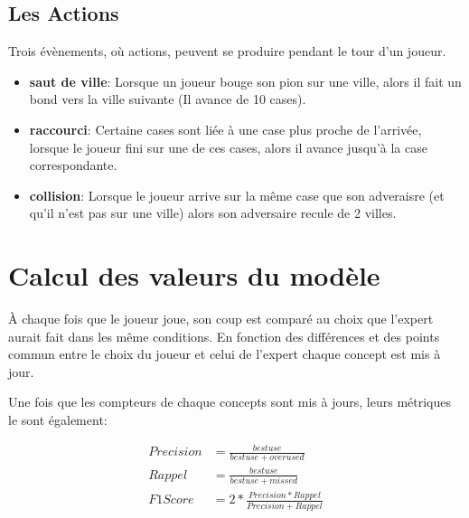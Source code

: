 \documentclass[a4paper, 12pt]{article}
\begin{document}
\subsection{Les Actions}
Trois évènements, où actions, peuvent se produire pendant le tour d'un joueur.
\begin{itemize}
	\item \textbf{saut de ville}: Lorsque un joueur bouge son pion sur une ville, alors il fait un bond vers la ville suivante (Il avance de 10 cases).
	\item \textbf{raccourci}: Certaine cases sont liée à une case plus proche de l'arrivée, lorsque le joueur fini sur une de ces cases, alors il avance jusqu'à la case correspondante.
	\item \textbf{collision}: Lorsque le joueur arrive sur la même case que son adveraisre (et qu'il n'est pas sur une ville) alors son adversaire recule de 2 villes.
\end{itemize}


\section{Calcul des valeurs du modèle}
À chaque fois que le joueur joue, son coup est comparé au choix que l'expert aurait fait dans les même conditions.
En fonction des différences et des points commun entre le choix du joueur et celui de l'expert chaque concept est mis à jour.

Une fois que les compteurs de chaque concepts sont mis à jours, leurs métriques le sont également:

\begin{align*}
	Precision &= \frac{bestuse}{bestuse + overused}\\
	Rappel    &= \frac{bestuse}{bestuse + missed}\\
	F1Score   &= 2*\frac{Precision * Rappel}{Precision + Rappel}
\end{align*}
\end{document}
